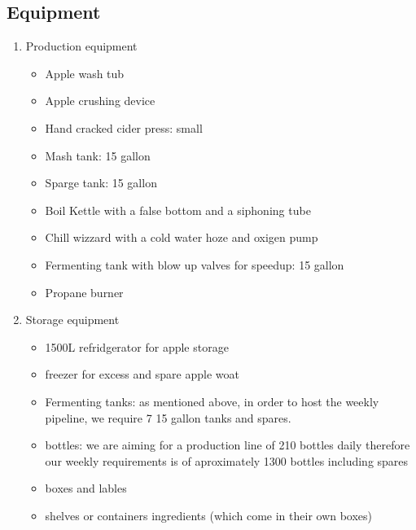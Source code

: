 \documentclass{article}
\begin{document}
  \subsection{Equipment}

    \begin{enumerate}
    \item Production equipment
      \begin{itemize}
      \item Apple wash tub
      \item Apple crushing device
      \item Hand cracked cider press: small
      \item Mash tank: 15 gallon
      \item Sparge tank: 15 gallon
      \item Boil Kettle with a false bottom and a siphoning tube
      \item Chill wizzard with a cold water hoze and oxigen pump
      \item Fermenting tank with blow up valves for speedup: 15 gallon
      \item Propane burner
      \end{itemize}

    \item Storage equipment
      \begin{itemize}
      \item 1500L refridgerator for apple storage
      \item freezer for excess and spare apple woat
      \item Fermenting tanks: as mentioned above, in order to host the weekly pipeline, we require 7 15 gallon tanks and spares.
      \item bottles: we are aiming for a production line of 210 bottles daily therefore our weekly requirements is of aproximately 1300 bottles including spares
      \item boxes and lables
      \item shelves or containers ingredients (which come in their own boxes)
      \end{itemize}


\end{enumerate}
\end{document}
